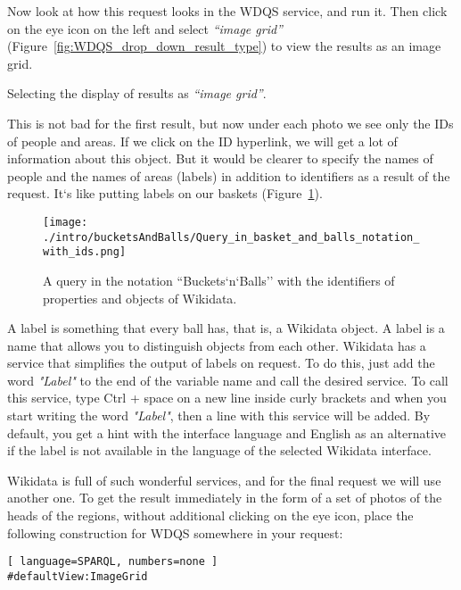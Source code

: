 Now look at how this request looks in the WDQS service, and run it. Then click on the eye icon on the left and select \textit{``image grid''} (Figure~\ref{fig:WDQS_drop_down_result_type}) to view the results as an image grid.

\begin{marginfigure}[-1cm]
	{
		\setlength{\fboxsep}{0pt}%
		\setlength{\fboxrule}{1pt}%
	}
    \caption{Selecting the display of results as \textit{``image grid''}.}
	\label{fig:WDQS_drop_down_result_type}
\end{marginfigure}

This is not bad for the first result, but now under each photo we see only the IDs of people and areas. If we click on the ID hyperlink, we will get a lot of information about this object. But it would be clearer to specify the names of people and the names of areas (labels) in addition to identifiers as a result of the request. It`s like putting labels on our baskets (Figure~\ref{fig:Query_in_basket_and_balls_notation_with_ids}).

\begin{figure}[h!]
\texttt{[image: ./intro/bucketsAndBalls/Query\_in\_basket\_and\_balls\_notation\_with\_ids.png]}
\caption{A query in the notation ``Buckets`n`Balls'' with the identifiers of properties and objects of Wikidata.}
%
\label{fig:Query_in_basket_and_balls_notation_with_ids}
\end{figure}

A label is something that every ball has, that is, a Wikidata object. 
A label is a name that allows you to distinguish objects from each other. 
Wikidata has a service that simplifies the output of labels on request. 
To do this, just add the word \textit{"Label"} to the end of the variable name 
and call the desired service. 
To call this service, type Ctrl + space on a new line inside curly brackets 
and when you start writing the word \textit{"Label"}, 
then a line with this service will be added. By default, you get a hint with the interface language and English as an alternative if the label is not available in the language of the selected Wikidata interface.

Wikidata is full of such wonderful services, and for the final request we will use another one. To get the result immediately in the form of a set of photos of the heads of the regions, without additional clicking on the eye icon, place the following construction for WDQS somewhere in your request:
\begin{lstlisting}[ language=SPARQL, numbers=none ]
#defaultView:ImageGrid
\end{lstlisting}

